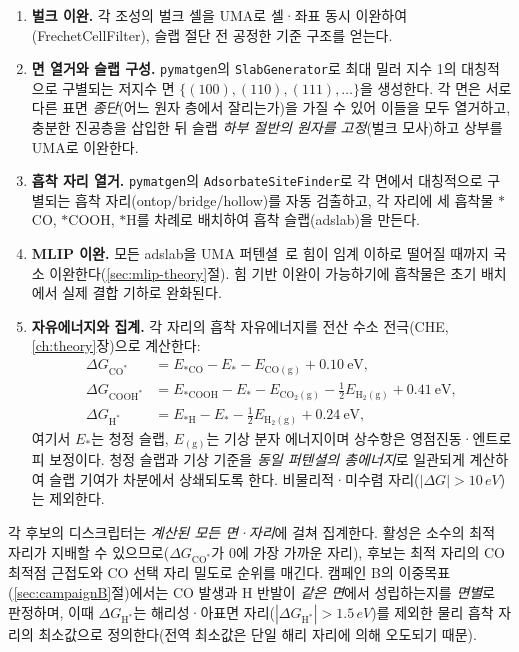 \documentclass[11pt,a4paper]{report}
\providecommand{\SI}[2]{#1\,#2}
\newcommand{\dGCO}{\Delta G_{\mathrm{CO^*}}}
\newcommand{\dGH}{\Delta G_{\mathrm{H^*}}}
\newcommand{\dGCOOH}{\Delta G_{\mathrm{COOH^*}}}
\begin{document}
\begin{enumerate}[nosep,leftmargin=1.4em]
\item \textbf{벌크 이완.} 각 조성의 벌크 셀을 UMA로 셀·좌표 동시 이완하여(FrechetCellFilter),
슬랩 절단 전 공정한 기준 구조를 얻는다.
\item \textbf{면 열거와 슬랩 구성.} \texttt{pymatgen}의 \texttt{SlabGenerator}로 최대 밀러 지수 1의
대칭적으로 구별되는 저지수 면 $\{(100),(110),(111),\dots\}$을 생성한다. 각 면은 서로 다른 표면
\emph{종단}(어느 원자 층에서 잘리는가)을 가질 수 있어 이들을 모두 열거하고, 충분한 진공층을 삽입한
뒤 슬랩 \emph{하부 절반의 원자를 고정}(벌크 모사)하고 상부를 UMA로 이완한다.
\item \textbf{흡착 자리 열거.} \texttt{pymatgen}의 \texttt{AdsorbateSiteFinder}로 각 면에서 대칭적으로
구별되는 흡착 자리(ontop/bridge/hollow)를 자동 검출하고, 각 자리에 세 흡착물 $*$CO, $*$COOH, $*$H를
차례로 배치하여 흡착 슬랩(adslab)을 만든다.
\item \textbf{MLIP 이완.} 모든 adslab을 UMA 퍼텐셜~\cite{uma2025}로 힘이 임계 이하로 떨어질 때까지
국소 이완한다(\ref{sec:mlip-theory}절). 힘 기반 이완이 가능하기에 흡착물은 초기 배치에서 실제 결합
기하로 완화된다.
\item \textbf{자유에너지와 집계.} 각 자리의 흡착 자유에너지를 전산 수소 전극(CHE, \ref{ch:theory}장)으로
계산한다:
\begin{align}
\dGCO   &= E_{*\mathrm{CO}}   - E_{*} - E_{\mathrm{CO(g)}} + 0.10~\text{eV},\nonumber\\
\dGCOOH &= E_{*\mathrm{COOH}} - E_{*} - E_{\mathrm{CO_2(g)}} - \tfrac12 E_{\mathrm{H_2(g)}} + 0.41~\text{eV},\\
\dGH    &= E_{*\mathrm{H}}    - E_{*} - \tfrac12 E_{\mathrm{H_2(g)}} + 0.24~\text{eV},\nonumber
\end{align}
여기서 $E_{*}$는 청정 슬랩, $E_{\mathrm{(g)}}$는 기상 분자 에너지이며 상수항은 영점진동·엔트로피
보정이다. 청정 슬랩과 기상 기준을 \emph{동일 퍼텐셜의 총에너지}로 일관되게 계산하여 슬랩 기여가
차분에서 상쇄되도록 한다. 비물리적·미수렴 자리($|\Delta G|>\SI{10}{eV}$)는 제외한다.
\end{enumerate}

\noindent 각 후보의 디스크립터는 \emph{계산된 모든 면·자리}에 걸쳐 집계한다. 활성은 소수의 최적
자리가 지배할 수 있으므로($\dGCO$가 0에 가장 가까운 자리), 후보는 최적 자리의 CO 최적점 근접도와
CO 선택 자리 밀도로 순위를 매긴다. 캠페인 B의 이중목표(\ref{sec:campaignB}절)에서는 CO 발생과 H
반발이 \emph{같은 면}에서 성립하는지를 \emph{면별}로 판정하며, 이때 $\dGH$는 해리성·아표면
자리($|\dGH|>\SI{1.5}{eV}$)를 제외한 물리 흡착 자리의 최소값으로 정의한다(전역 최소값은 단일 해리
자리에 의해 오도되기 때문).
\end{document}
